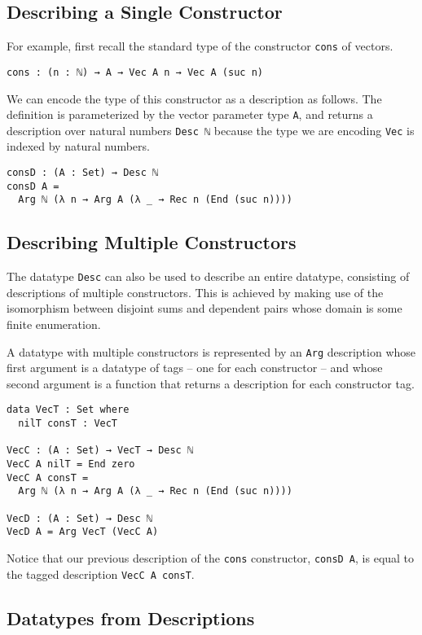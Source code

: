 \documentclass[preprint,nonatbib]{sigplanconf}
\begin{document}
\subsection{Describing a Single Constructor}

For example, first recall the standard type of the
constructor {\tt cons} of vectors.

\begin{verbatim}
cons : (n : ℕ) → A → Vec A n → Vec A (suc n)
\end{verbatim}

We can encode the type of this constructor as a description as
follows. The definition is parameterized by the vector parameter
type {\tt A}, and returns a description over natural numbers
{\tt Desc ℕ} because the type we are encoding {\tt Vec}
is indexed by natural numbers.

\begin{verbatim}
consD : (A : Set) → Desc ℕ
consD A =
  Arg ℕ (λ n → Arg A (λ _ → Rec n (End (suc n))))
\end{verbatim}

\subsection{Describing Multiple Constructors}

The datatype {\tt Desc} can also be used to describe an entire
datatype, consisting of descriptions of multiple constructors.
This is achieved by making use of the isomorphism between disjoint
sums and dependent pairs whose domain is some finite enumeration.

A datatype with multiple constructors is represented by an
{\tt Arg} description whose first argument is a datatype of tags
-- one for each constructor -- and whose second argument is
a function that returns a description for each constructor tag.

\begin{verbatim}
data VecT : Set where
  nilT consT : VecT

VecC : (A : Set) → VecT → Desc ℕ
VecC A nilT = End zero
VecC A consT =
  Arg ℕ (λ n → Arg A (λ _ → Rec n (End (suc n))))

VecD : (A : Set) → Desc ℕ
VecD A = Arg VecT (VecC A)
\end{verbatim}

Notice that our previous description of the {\tt cons} constructor,
{\tt consD A}, is equal to the tagged description
{\tt VecC A consT}.

\subsection{Datatypes from Descriptions}
\end{document}
